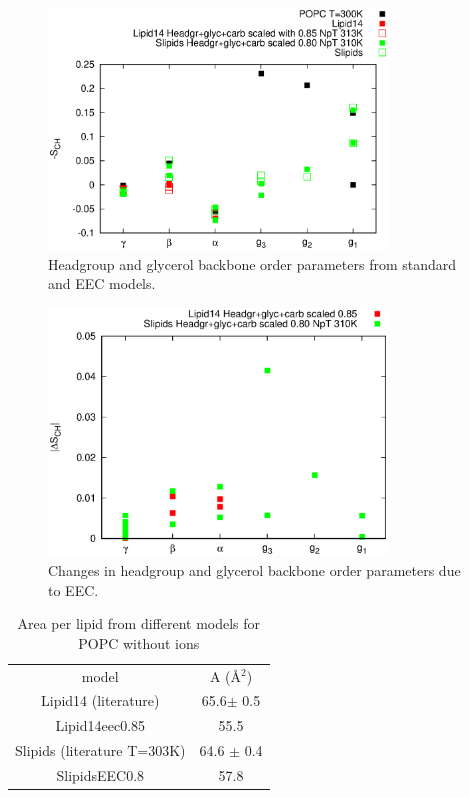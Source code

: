 \documentclass[aps,prl,superscriptaddress,twocolumn]{revtex4}
\begin{document}
\begin{figure}[]
  \centering
  \includegraphics[width=9.0cm]{../Fig/HGopsNEWmodels.eps}
  \caption{\label{HGopsNEWmodels}
    Headgroup and glycerol backbone order parameters from standard and EEC models.}
\end{figure}

\begin{figure}[]
  \centering
  \includegraphics[width=9.0cm]{../Fig/HGopsNEWmodelsCHANGE.eps}
  \caption{\label{HGopsNEWmodelsCHANGE}
    Changes in headgroup and glycerol backbone order parameters due to EEC.}
\end{figure}


\begin{table}
  \caption{Area per lipid from different models for POPC without ions\label{apls} }
  \begin{tabular}{c c}
    model          & A (Å$^2$)    \\
    Lipid14 (literature)  & 65.6$\pm$ 0.5   \\
    Lipid14eec0.85 & 55.5      \\
    Slipids (literature T=303K)       & 64.6 $\pm$ 0.4   \\
    SlipidsEEC0.8  & 57.8  \\
  \end{tabular}
\end{table}
\end{document}
